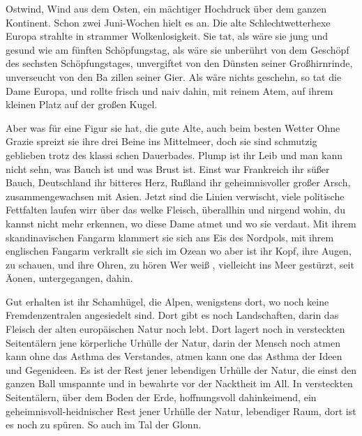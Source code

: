 

\noindent{}
Ostwind, Wind aus dem Osten, ein mächtiger Hochdruck über
dem ganzen Kontinent. Schon zwei Juni-Wochen hielt es an.
Die alte Schlechtwetterhexe Europa strahlte in strammer
Wolkenlosigkeit. Sie tat, als wäre sie jung und ge\-sund wie
am fünften Schöpfungstag, als wäre sie unberührt von dem
Geschöpf des sechsten Schöpfungstages, unvergiftet von den
Dünsten seiner Großhirnrinde, unverseucht von den Ba\-%
zillen seiner Gier. Als wäre nichts geschehn, so tat die Dame
Europa, und rollte frisch und naiv dahin, mit reinem Atem,
auf ihrem kleinen Platz auf der großen Kugel.

Aber was für eine Figur sie hat, die gute Alte, auch beim
besten Wetter\ausr{} Ohne Grazie spreizt sie ihre drei Beine ins
Mittelmeer, doch sie sind schmutzig geblieben trotz des klassi\-%
schen Dauerbades. Plump ist ihr Leib und man kann nicht
sehn, was Bauch ist und was Brust ist. Einst war Frankreich
ihr süßer Bauch, Deutschland ihr bitteres Herz, Rußland ihr
geheimnisvoller großer Arsch, zusammengewachsen mit Asien.
Jetzt sind die Linien verwischt, viele politische Fettfalten
laufen wirr über das welke Fleisch, überallhin und nirgend\-%
wohin, du kannst nicht mehr erkennen, wo diese Dame atmet
und wo sie verdaut. Mit ihrem skandinavischen Fangarm
klammert sie sich ans Eis des Nordpols, mit ihrem englischen
Fangarm verkrallt sie sich im Ozean\dopp{} wo aber ist ihr Kopf,
ihre Augen, zu schauen, und ihre Ohren, zu hören\frag{} Wer weiß%
\eingriff{weiß, vielleicht ] weiß vielleicht},
vielleicht ins Meer gestürzt, seit Äonen, untergegangen,
dahin.

Gut erhalten ist ihr Schamhügel, die Alpen, wenigstens dort,
wo noch keine Fremdenzentralen angesiedelt sind. Dort gibt
es noch Landschaften, darin das Fleisch der alten europäischen
Natur noch lebt. Dort lagert noch in versteckten Seitentälern
jene körperliche Urhülle der Natur, darin der Mensch noch
atmen kann ohne das Asthma des Verstandes, atmen kann
one das Asthma der Ideen und Gegenideen. Es ist der Rest
jener lebendigen Urhülle der Natur, die einst den ganzen
Ball umspannte und in bewahrte vor der Nacktheit im All.
In versteckten Seitentälern, über dem Boden der Erde,
hoffnungsvoll dahinkeimend, ein geheimnisvoll-heidnischer
Rest jener Urhülle der Natur, lebendiger Raum, dort ist es
noch zu spüren. So auch im Tal der Glonn.

